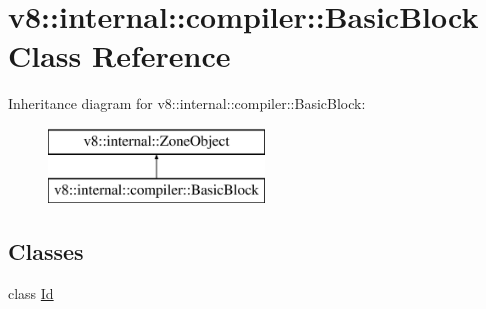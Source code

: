 \hypertarget{classv8_1_1internal_1_1compiler_1_1_basic_block}{}\section{v8\+:\+:internal\+:\+:compiler\+:\+:Basic\+Block Class Reference}
\label{classv8_1_1internal_1_1compiler_1_1_basic_block}
Inheritance diagram for v8\+:\+:internal\+:\+:compiler\+:\+:Basic\+Block\+:\begin{figure}[H]
\begin{center}
\leavevmode
\includegraphics[height=2.000000cm]{classv8_1_1internal_1_1compiler_1_1_basic_block}
\end{center}
\end{figure}
\subsection*{Classes}
\begin{DoxyCompactItemize}
\item 
class \hyperlink{classv8_1_1internal_1_1compiler_1_1_basic_block_1_1_id}{Id}
\end{DoxyCompactItemize}
